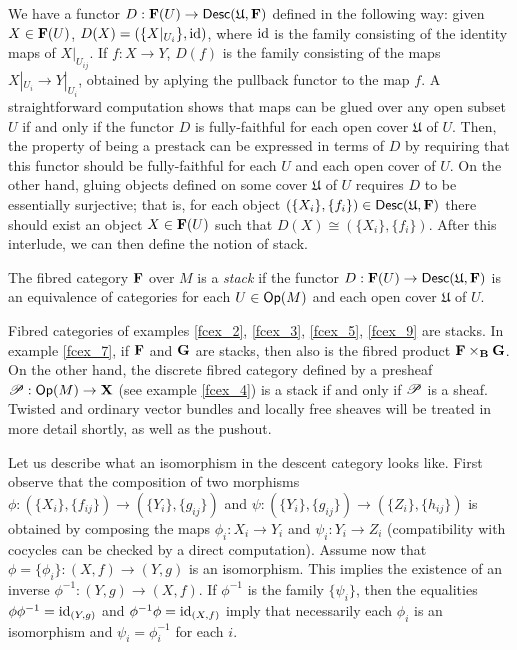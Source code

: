 We have a functor $D:{\bf F}(U)\to \mathsf{Desc}(\mathfrak{U},{\bf F})$ defined in the following way: given $X\in {\bf F}(U)$, $D(X)=(\{X|_{U_i}\},\operatorname{id})$, where $\operatorname{id}$ is the family consisting of the identity maps of $X|_{U_{ij}}$. If $f:X\to Y$, $D(f)$ is the family consisting of the maps $X|_{U_i}\to Y|_{U_i}$, obtained by aplying the pullback functor to the map $f$. A straightforward computation shows that maps can be glued over any open subset $U$ if and only if the functor $D$ is fully-faithful for each open cover $\mathfrak{U}$ of $U$. Then, the property of being a prestack can be expressed in terms of $D$ by requiring that this functor should be fully-faithful for each $U$ and each open cover of $U$. On the other hand, gluing objects defined on some cover $\mathfrak{U}$ of $U$ requires $D$ to be essentially surjective; that is, for each object $(\{X_i\},\{f_i\})\in \mathsf{Desc}(\mathfrak{U},{\bf F})$ there should exist an object $X\in {\bf F}(U)$ such that $D(X)\cong (\{X_i\},\{f_i\})$. After this interlude, we can then define the notion of stack.

\begin{defi}
The fibred category ${\bf F}$ over $M$ is a \emph{stack} if the functor $D:{\bf F}(U)\to \mathsf{Desc}(\mathfrak{U},{\bf F})$ is an equivalence of categories for each $U\in \mathsf{Op}(M)$ and each open cover $\mathfrak{U}$ of $U$.
\end{defi}

Fibred categories of examples \ref{fcex_2}, \ref{fcex_3}, \ref{fcex_5}, \ref{fcex_9} are stacks. In example \ref{fcex_7}, if ${\bf F}$ and ${\bf G}$ are stacks, then also is the fibred product ${\bf F}\times_{{\bf B}}{\bf G}$. On the other hand, the discrete fibred category defined by a presheaf $\mathscr{P}:\mathsf{Op}(M)\to {\bf X}$ (see example \ref{fcex_4}) is a stack if and only if $\mathscr{P}$ is a sheaf. Twisted and ordinary vector bundles and locally free sheaves will be treated in more detail shortly, as well as the pushout.

\begin{obs}
Let us describe what an isomorphism in the descent category looks like. First observe that the composition of two morphisms $\phi :(\{X_i\},\{f_{ij}\})\to (\{Y_i\},\{g_{ij}\})$ and $\psi :(\{Y_i\},\{g_{ij}\})\to (\{Z_i\},\{h_{ij}\})$ is obtained by composing the maps $\phi_i:X_i\to Y_i$ and $\psi_i:Y_i\to Z_i$ (compatibility with cocycles can be checked by a direct computation). Assume now that $\phi=\{\phi_i\} :(X,f)\to (Y,g)$ is an isomorphism. This implies the existence of an inverse $\phi^{-1}:(Y,g)\to (X,f)$. If $\phi^{-1}$ is the family $\{\psi_i\}$, then the equalities $\phi \phi^{-1}=\operatorname{id}_{(Y,g)}$ and $\phi^{-1}\phi =\operatorname{id}_{(X,f)}$ imply that necessarily each $\phi_i$ is an isomorphism and $\psi_i=\phi_i^{-1}$ for each $i$.
\end{obs}


